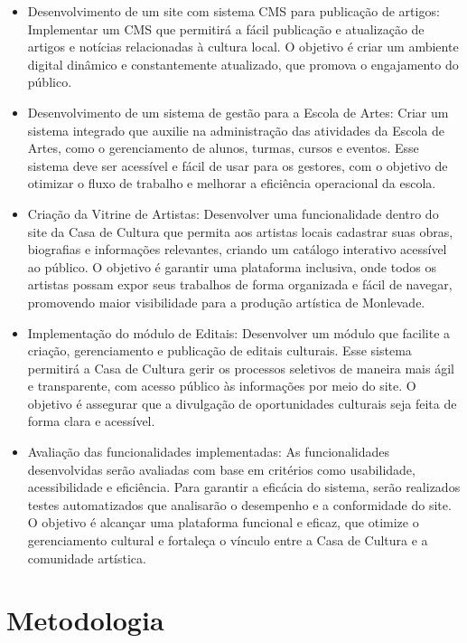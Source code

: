 \begin{itemize}
	\item Desenvolvimento de um site com sistema \ac{CMS} para publicação de artigos: Implementar um \ac{CMS} que permitirá a fácil publicação e atualização de artigos e notícias relacionadas à cultura local. O objetivo é criar um ambiente digital dinâmico e constantemente atualizado, que promova o engajamento do público.

	\item Desenvolvimento de um sistema de gestão para a Escola de Artes: Criar um sistema integrado que auxilie na administração das atividades da Escola de Artes, como o gerenciamento de alunos, turmas, cursos e eventos. Esse sistema deve ser acessível e fácil de usar para os gestores, com o objetivo de otimizar o fluxo de trabalho e melhorar a eficiência operacional da escola.

	\item Criação da Vitrine de Artistas: Desenvolver uma funcionalidade dentro do site da Casa de Cultura que permita aos artistas locais cadastrar suas obras, biografias e informações relevantes, criando um catálogo interativo acessível ao público. O objetivo é garantir uma plataforma inclusiva, onde todos os artistas possam expor seus trabalhos de forma organizada e fácil de navegar, promovendo maior visibilidade para a produção artística de Monlevade.

	\item Implementação do módulo de Editais: Desenvolver um módulo que facilite a criação, gerenciamento e publicação de editais culturais. Esse sistema permitirá a Casa de Cultura gerir os processos seletivos de maneira mais ágil e transparente, com acesso público às informações por meio do site. O objetivo é assegurar que a divulgação de oportunidades culturais seja feita de forma clara e acessível.

	\item Avaliação das funcionalidades implementadas: As funcionalidades desenvolvidas serão avaliadas com base em critérios como usabilidade, acessibilidade e eficiência. Para garantir a eficácia do sistema, serão realizados testes automatizados que analisarão o desempenho e a conformidade do site. O objetivo é alcançar uma plataforma funcional e eficaz, que otimize o gerenciamento cultural e fortaleça o vínculo entre a Casa de Cultura e a comunidade artística.
\end{itemize}


\section{Metodologia}
\label{sec:metodologia}

